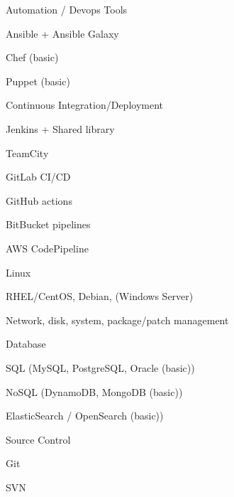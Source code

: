 \begin{cvskills}
  \cvskill
    {Automation / Devops Tools} %
    {
      \begin{cvitems} %
        \item {Ansible + Ansible Galaxy} %
        \item {Chef (basic)} %
        \item {Puppet (basic)} %
      \end{cvitems}
    }

  \cvskill
    {Continuous Integration/Deployment} %
    {
      \begin{cvitems} %
        \item {Jenkins + Shared library} %
        \item {TeamCity} %
        \item {GitLab CI/CD} %
        \item {GitHub actions} %
        \item {BitBucket pipelines} %
        \item {AWS CodePipeline} %
      \end{cvitems}
    }

  \cvskill
    {Linux} %
    {
      \begin{cvitems} %
        \item {RHEL/CentOS, Debian, (Windows Server)} %
        \item {Network, disk, system, package/patch management} %
      \end{cvitems}
    }

  \cvskill
    {Database} %
    {
      \begin{cvitems} %
        \item {SQL (MySQL, PostgreSQL, Oracle (basic))} %
        \item {NoSQL (DynamoDB, MongoDB (basic))} %
        \item {ElasticSearch / OpenSearch (basic))} %
      \end{cvitems}
    }

  \cvskill
    {Source Control} %
    {
      \begin{cvitems} %
        \item {Git} %
        \item {SVN} %
      \end{cvitems}
    }


\end{cvskills}
